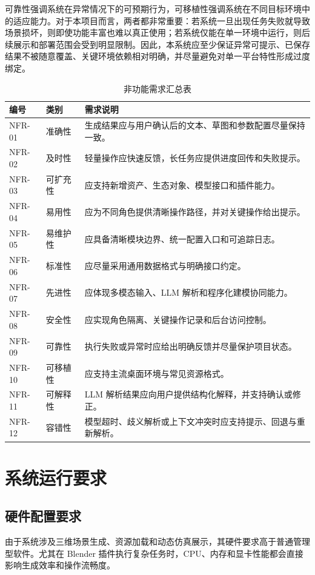 \documentclass[UTF8,a4paper,10pt]{ctexart}
\begin{document}
可靠性强调系统在异常情况下的可预期行为，可移植性强调系统在不同目标环境中的适应能力。对于本项目而言，两者都非常重要：若系统一旦出现任务失败就导致场景损坏，则即使功能丰富也难以真正使用；若系统仅能在单一环境中运行，则后续展示和部署范围会受到明显限制。因此，本系统应至少保证异常可提示、已保存结果不被随意覆盖、关键环境依赖相对明确，并尽量避免对单一平台特性形成过度绑定。
{
\renewcommand{\arraystretch}{1.3}
\begin{table}[H]
\centering
\caption{非功能需求汇总表}
\begin{tabularx}{\textwidth}{p{1.8cm} p{2.6cm} Y}
\toprule
{}
编号 & 类别 & 需求说明 \\
\midrule
NFR-01 & 准确性 & 生成结果应与用户确认后的文本、草图和参数配置尽量保持一致。 \\
NFR-02 & 及时性 & 轻量操作应快速反馈，长任务应提供进度回传和失败提示。 \\
NFR-03 & 可扩充性 & 应支持新增资产、生态对象、模型接口和插件能力。 \\
NFR-04 & 易用性 & 应为不同角色提供清晰操作路径，并对关键操作给出提示。 \\
NFR-05 & 易维护性 & 应具备清晰模块边界、统一配置入口和可追踪日志。 \\
NFR-06 & 标准性 & 应尽量采用通用数据格式与明确接口约定。 \\
NFR-07 & 先进性 & 应体现多模态输入、LLM 解析和程序化建模协同能力。 \\
NFR-08 & 安全性 & 应实现角色隔离、关键操作记录和后台访问控制。 \\
NFR-09 & 可靠性 & 执行失败或异常时应给出明确反馈并尽量保护项目状态。 \\
NFR-10 & 可移植性 & 应支持主流桌面环境与常见资源格式。 \\
NFR-11 & 可解释性 & LLM 解析结果应向用户提供结构化解释，并支持确认或修正。 \\
NFR-12 & 容错性 & 模型超时、歧义解析或上下文冲突时应支持提示、回退与重新解析。 \\
\bottomrule
\end{tabularx}
\end{table}
}

\section{系统运行要求}

\subsection{硬件配置要求}
由于系统涉及三维场景生成、资源加载和动态仿真展示，其硬件要求高于普通管理型软件。尤其在 Blender 插件执行复杂任务时，CPU、内存和显卡性能都会直接影响生成效率和操作流畅度。
\end{document}
